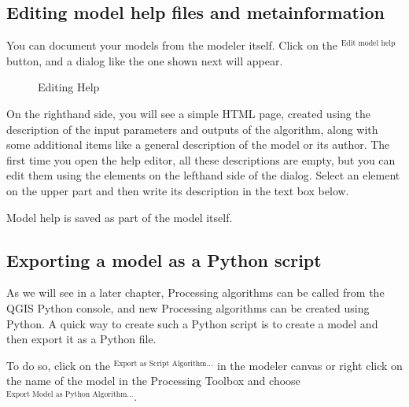 \documentclass[letterpaper,10pt,english]{sphinxmanual}
\begin{document}
\subsection{Editing model help files and meta\sphinxhyphen{}information}
\label{\detokenize{Introduction/models:editing-model-help-files-and-meta-information}}
\sphinxAtStartPar
You can document your models from the modeler itself.
Click on the $^{\text{Edit model help}}$ button, and a
dialog like the one shown next will appear.

\begin{figure}[H]
\centering
\capstart

\noindent{}
\caption{Editing Help}\label{\detokenize{Introduction/models:id13}}\label{\detokenize{Introduction/models:figure-help-edition}}\end{figure}

\sphinxAtStartPar
On the right\sphinxhyphen{}hand side, you will see a simple HTML page, created using
the description of the input parameters and outputs of the algorithm,
along with some additional items like a general description of the
model or its author.
The first time you open the help editor, all these descriptions are
empty, but you can edit them using the elements on the left\sphinxhyphen{}hand side
of the dialog.
Select an element on the upper part and then write its description in
the text box below.

\sphinxAtStartPar
Model help is saved as part of the model itself.


\subsection{Exporting a model as a Python script}
\label{\detokenize{Introduction/models:exporting-a-model-as-a-python-script}}
\sphinxAtStartPar
As we will see in a later chapter, Processing algorithms can be called
from the QGIS Python console, and new Processing algorithms can be
created using Python.
A quick way to create such a Python script is to create a model and
then export it as a Python file.

\sphinxAtStartPar
To do so, click on the $^{\text{Export as Script Algorithm…}}$
in the modeler canvas or right click on the name of the model in the Processing
Toolbox and choose $^{\text{Export Model as Python Algorithm…}}$.
\end{document}
